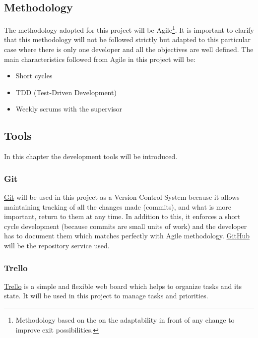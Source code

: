\subsection{Methodology}
The methodology adopted for this project will be Agile\footnote{Methodology based on the on the adaptability in front of any change to improve exit possibilities.}. It is important to clarify that this methodology will not be followed strictly but adapted to this particular case where there is only one developer and all the objectives are well defined. The main characteristics followed from Agile in this project will be:
\begin{itemize}
	\item Short cycles
	\item TDD (Test-Driven Development)
	\item Weekly scrums with the supervisor
\end{itemize}

\subsection{Tools}
In this chapter the development tools will be introduced. 
\subsubsection{Git}
\href{https://git-scm.com/}{Git} will be used in this project as a Version Control System because it allows maintaining tracking of all the changes made (commits), and what is more important, return to them at any time. In addition to this, it enforces a short cycle development (because commits are small units of work) and the developer has to document them which matches perfectly with Agile methodology. \href{https://github.com}{GitHub} will be the repository service used.
\subsubsection{Trello}
\href{https://trello.com}{Trello} is a simple and flexible web board which helps to organize tasks and its state. It will be used in this project to manage tasks and priorities.  

